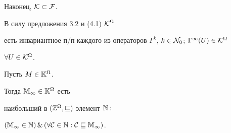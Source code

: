 Наконец, ${\cal K} \subset {\cal F}$.


В силу предложения 3.2 и (4.1) ${\cal K}^\Omega$


есть инвариантное п/п каждого из операторов ${{\Gamma}^k}$, $k \in


{{\cal N}_0}$; ${{\Gamma}^\infty}(U) \in {{\cal K}^\Omega}$


$\forall{U} \in {{\cal K}^\Omega}$.





\begin{thms}


Пусть $M \in {{\Bbb K}^\Omega}$.


Тогда ${{\Bbb M}_\infty} \in {{\Bbb K}^\Omega}$ есть


наибольший в $({{\Bbb Z}^\Omega},\sqsubseteq)$ элемент ${\Bbb N}:$


$({{\Bbb M}_\infty} \in {\Bbb N})\, \&\, (\forall{\cal C} \in {\Bbb N}:


{\cal C} \sqsubseteq {{\Bbb M}_\infty})$.


\end{thms}





